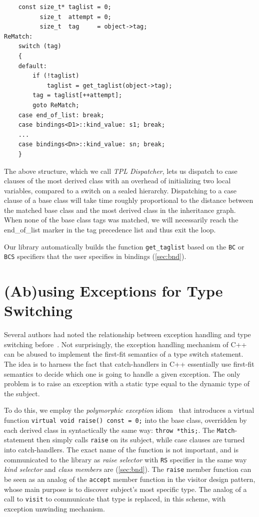 \documentclass[preprint]{sigplanconf}
\makeatletter
\DeclareRobustCommand{\code}[1]{{\lstinline[breaklines=false,escapechar=@]{#1}}}
\makeatother
\begin{document}
\begin{lstlisting}
    const size_t* taglist = 0;
          size_t  attempt = 0;
          size_t  tag     = object->tag;
ReMatch:
    switch (tag) 
    {
    default:
        if (!taglist) 
            taglist = get_taglist(object->tag);
        tag = taglist[++attempt];
        goto ReMatch;
    case end_of_list: break;
    case bindings<D1>::kind_value: s1; break;
    ...
    case bindings<Dn>::kind_value: sn; break;
    }
\end{lstlisting}

\noindent
The above structure, which we call \emph{TPL Dispatcher}, lets us dispatch to case clauses of the most derived class 
with an overhead of initializing two local variables, compared to a switch on a 
sealed hierarchy. Dispatching to a case clause of a base class will take time 
roughly proportional to the distance between the matched base class and the most 
derived class in the inheritance graph. When none of the base class tags was 
matched, we will necessarily reach the end\_of\_list marker in the tag precedence 
list and thus exit the loop.

Our library automatically builds the function \code{get_taglist} based on the 
\code{BC} or \code{BCS} specifiers that the user specifies in bindings 
(\textsection\ref{sec:bnd}).

\section{(Ab)using Exceptions for Type Switching}
\label{sec:xpm}

Several authors had noted the relationship between exception handling and type 
switching before~\cite{Glew99,ML2000}. Not surprisingly, the exception handling 
mechanism of C++ can be abused to implement the first-fit semantics of a type 
switch statement. The idea is to harness the fact that catch-handlers in C++ 
essentially use first-fit semantics to decide which one is going to handle a 
given exception. The only problem is to raise an exception with a static type 
equal to the dynamic type of the subject.

To do this, we employ the \emph{polymorphic exception} idiom~\cite{PolyExcept} that 
introduces a virtual function \code{virtual void raise() const = 0;} into the 
base class, overridden by each derived class in syntactically the same way: 
\code{throw *this;}. The \code{Match}-statement then simply calls \code{raise} on its subject, 
while case clauses are turned into catch-handlers.
The exact name of the function is not important, and is communicated to the 
library as \emph{raise selector} with \code{RS} specifier in the same way 
\emph{kind selector} and \emph{class members} are (\textsection\ref{sec:bnd}). 
The \code{raise} member function can be seen as an analog of the \code{accept} 
member function in the visitor design pattern, whose main purpose is to discover 
subject's most specific type. The analog of a call to \code{visit} to communicate 
that type is replaced, in this scheme, with exception unwinding mechanism.
\end{document}

